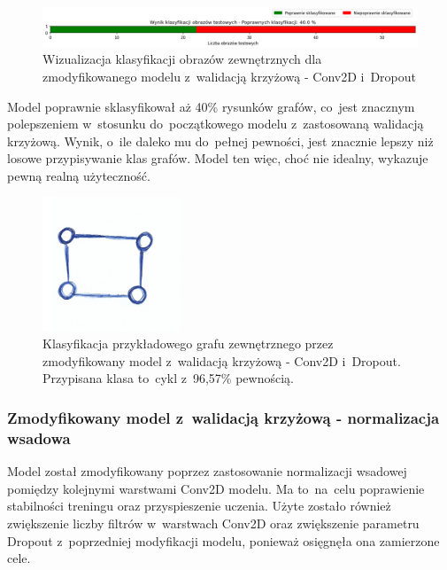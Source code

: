 \begin{figure}[ht]
	\centering
	\includegraphics[width=15.5cm]{resources/tests/images/v4/crossvalid_1_bar.png}
	\caption{Wizualizacja klasyfikacji obrazów zewnętrznych dla zmodyfikowanego modelu z~walidacją krzyżową - Conv2D i~Dropout}
	\label{Fig:tests-cv-1c}
\end{figure}
\FloatBarrier

Model poprawnie sklasyfikował aż 40\% rysunków grafów,
co~jest znacznym polepszeniem w~stosunku do~początkowego modelu z~zastosowaną walidacją krzyżową.
Wynik, o~ile daleko mu do~pełnej pewności, jest znacznie lepszy niż losowe przypisywanie klas grafów.
Model ten więc, choć nie idealny, wykazuje pewną realną użyteczność.

\begin{figure}[ht]
	\centering
	\includegraphics[height=4cm]{../graph_classification/test_graphs/drawn/cycle-6.png}
	\caption{Klasyfikacja przykładowego grafu zewnętrznego przez zmodyfikowany model z~walidacją krzyżową - Conv2D i~Dropout.
		Przypisana klasa to~cykl z~96,57\% pewnością.}
	\label{Fig:tests-cv-1d}
\end{figure}
\FloatBarrier

\subsubsection{Zmodyfikowany model z~walidacją krzyżową - normalizacja wsadowa}

Model został zmodyfikowany poprzez zastosowanie normalizacji wsadowej pomiędzy kolejnymi warstwami Conv2D modelu.
Ma to~na~celu poprawienie stabilności treningu oraz przyspieszenie uczenia.
Użyte zostało również zwiększenie liczby filtrów w~warstwach Conv2D oraz zwiększenie parametru Dropout
z~poprzedniej modyfikacji modelu, ponieważ osięgnęła ona zamierzone cele.

